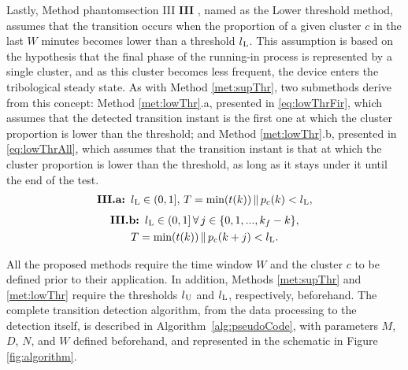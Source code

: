 \documentclass[preprint,11pt,number]{elsarticle}
\makeatletter
\newcommand{\labeltext}[3][]{%
    \@bsphack%
    \csname phantomsection\endcsname%
    \def\tst{#1}%
    \def\labelmarkup{}%
    \def\refmarkup{}%
    \ifx\tst\empty\def\@currentlabel{\refmarkup{#2}}{\label{#3}}%
    \else\def\@currentlabel{\refmarkup{#1}}{\label{#3}}\fi%
    \@esphack%
    \labelmarkup{#2}%
}
\makeatother
\begin{document}
Lastly, Method \labeltext[III]{\textbf{III}}{met:lowThr}, named as the Lower threshold method, assumes that the transition occurs when the proportion of a given cluster $c$ in the last $W$ minutes becomes lower than a threshold $l\textsubscript{L}$. This assumption is based on the hypothesis that the final phase of the running-in process is represented by a single cluster, and as this cluster becomes less frequent, the device enters the tribological steady state. As with Method \ref{met:supThr}, two submethods derive from this concept: Method \ref{met:lowThr}.a, presented in \eqref{eq:lowThrFir}, which assumes that the detected transition instant is the first one at which the cluster proportion is lower than the threshold; and Method \ref{met:lowThr}.b, presented in \eqref{eq:lowThrAll}, which assumes that the transition instant is that at which the cluster proportion is lower than the threshold, as long as it stays under it until the end of the test.
\begin{equation}\label{eq:lowThrFir}
\begin{gathered}
    \textbf{III.a: } l\textsubscript{L} \in (0,1], \,T = \text{min}(t(k)) \,\|\,p_c(k)<l\textsubscript{L},
\end{gathered}
\end{equation}
\begin{equation}\label{eq:lowThrAll}
\begin{gathered}
    \textbf{III.b: } l\textsubscript{L} \in (0,1] \,\forall\, j \in \{0, 1, ..., k_f-k\}, \\ T = \text{min}(t(k))\,\|\,p_c(k+j)<l\textsubscript{L}.
\end{gathered}
\end{equation}

All the proposed methods require the time window $W$ and the cluster $c$ to be defined prior to their application. In addition, Methods \ref{met:supThr} and \ref{met:lowThr} require the thresholds $l\textsubscript{U}$ and $l\textsubscript{L}$, respectively, beforehand. The complete transition detection algorithm, from the data processing to the detection itself, is described in Algorithm~\ref{alg:pseudoCode}, with parameters $M$, $D$, $N$, and $W$ defined beforehand, and represented in the schematic in Figure \ref{fig:algorithm}.
\end{document}
